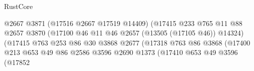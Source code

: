 \begin{lexlean}{RustCore}
\begin{coremodule}
                                                    @2667
                                                    @3871
                                                    (@17516 @2667 @17519 @14409)
                                                    (@17415
                                                      @233
                                                      @765
                                                      @11
                                                      @88
                                                      @2657
                                                      @3870
                                                      (@17100
                                                        @46
                                                        @11
                                                        @46
                                                        @2657
                                                        (@13505 (@17105 @46))
                                                        @14324)
                                                      (@17415
                                                        @763
                                                        @253
                                                        @86
                                                        @30
                                                        @3868
                                                        @2677
                                                        (@17318
                                                          @763
                                                          @86
                                                          @3868
                                                          (@17400
                                                            @213
                                                            @653
                                                            @49
                                                            @86
                                                            @2586
                                                            @3596
                                                            @2690
                                                            @1373
                                                            (@17410
                                                              @653
                                                              @49
                                                              @3596
                                                              (@17852

\end{coremodule}
\end{lexlean}
